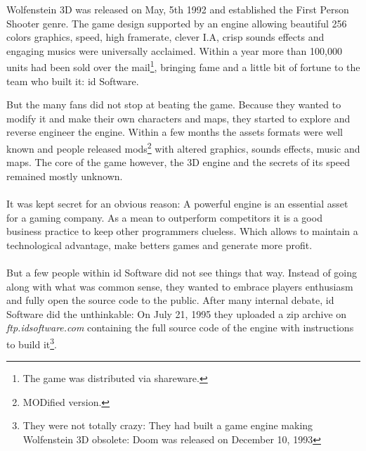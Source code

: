 Wolfenstein 3D was released on May, 5th 1992 and established the First Person Shooter genre. The game design supported by an engine allowing beautiful 256 colors graphics, speed, high framerate, clever I.A, crisp sounds effects and engaging musics were universally acclaimed. Within a year more than 100,000 units had been sold over the mail\footnote{The game was distributed via shareware.}, bringing fame and a little bit of fortune to the team who built it: id Software.\\
\par
\begin{figure}[H]
\centering
{}
\end{figure}
\par
But the many fans did not stop at beating the game. Because they wanted to modify it and make their own characters and maps, they started to explore and reverse engineer the engine. Within a few months the assets formats were well known and people released mods\footnote{MODified version.} with altered graphics, sounds effects, music and maps. The core of the game however, the 3D engine and the secrets of its speed remained mostly unknown.\\
\\
It was kept secret for an obvious reason: A powerful engine is an essential asset for a gaming company. As a mean to outperform competitors it is a good business practice to keep other programmers clueless. Which allows to maintain a technological advantage, make betters games and generate more profit.\\
\\
But a few people within id Software did not see things that way. Instead of going along with what was common sense, they wanted to embrace players enthusiasm and fully open the source code to the public. After many internal debate, id Software did the unthinkable: On July 21, 1995 they uploaded a zip archive on \emph{ftp.idsoftware.com} containing the full source code of the engine with instructions to build it\footnote{They were not totally crazy: They had built a game engine making Wolfenstein 3D obsolete: Doom was released on December 10, 1993}.\\

